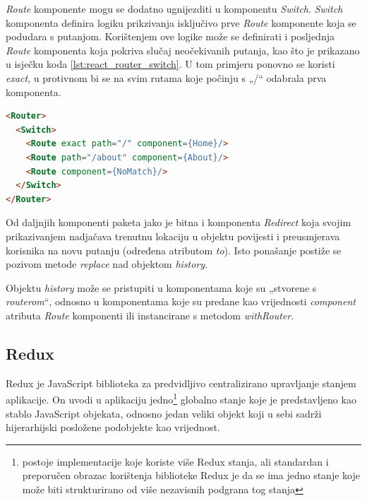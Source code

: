 \documentclass[times, utf8, diplomski, numeric]{fer}
\newcommand{\razmakp}{\vspace{18pt}}
\newcommand{\razmaks}{\vspace{10pt}}
\begin{document}
\emph{Route} komponente mogu se dodatno ugnijezditi u komponentu \emph{Switch}.
\emph{Switch} komponenta definira logiku prikzivanja isključivo prve \emph{Route} komponente koja se podudara s putanjom.
Korištenjem ove logike može se definirati i posljednja \emph{Route} komponenta koja pokriva slučaj neočekivanih putanja, kao što je prikazano u isječku koda \ref{lst:react_router_switch}.
U tom primjeru ponovno se koristi \emph{exact}, u protivnom bi se na svim rutama koje počinju s „/“ odabrala prva komponenta.

\razmakp %
\begin{lstlisting}[language=html, caption={Primjer korištenja \emph{Switch}komponente}, label={lst:react_router_switch}]
<Router>
  <Switch>
    <Route exact path="/" component={Home}/>
    <Route path="/about" component={About}/>
    <Route component={NoMatch}/>
  </Switch>
</Router>
\end{lstlisting}
\razmaks

Od daljnjih komponenti paketa jako je bitna i komponenta \emph{Redirect} koja svojim prikazivanjem nadjačava trenutnu lokaciju u objektu povijesti i preusmjerava korisnika na novu putanju (određena atributom \emph{to}).
Isto ponašanje postiže se pozivom metode \emph{replace} nad objektom \emph{history}.

Objektu \emph{history} može se pristupiti u komponentama koje su „stvorene s \emph{routerom}“, odnosno u komponentama koje su predane kao vrijednosti \emph{component} atributa \emph{Route} komponenti ili instancirane s metodom \emph{withRouter}.


\razmaks
\subsection{Redux}

Redux je JavaScript biblioteka za predvidljivo centralizirano upravljanje stanjem aplikacije.
On uvodi u aplikaciju jedno\footnote{
    postoje implementacije koje koriste više Redux stanja, ali standardan i preporučen obrazac korištenja biblioteke Redux je da se ima jedno stanje koje može biti strukturirano od više nezavisnih podgrana tog stanja
} globalno stanje koje je predstavljeno kao stablo JavaScript objekata, odnosno jedan veliki objekt koji u sebi sadrži hijerarhijski posložene podobjekte kao vrijednost.
\end{document}

